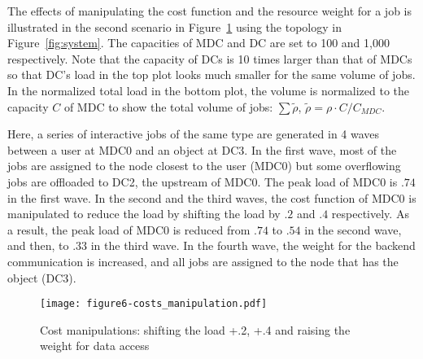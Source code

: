 The effects of manipulating the cost function and the resource weight
for a job is illustrated in the second scenario in
Figure~\ref{fig:lowering} using the topology in Figure~\ref{fig:system}.
The capacities of MDC and DC are set to 100 and 1,000 respectively.
Note that the capacity of DCs is 10 times larger than that of MDCs
so that DC's load in the top plot looks much smaller for the same
volume of jobs.
In the normalized total load in the bottom plot, the volume is normalized
to the capacity $C$ of MDC to show the total volume of jobs:
$\sum \tilde{\rho}$, \:$\tilde{\rho} = \rho \cdot C/C_{MDC}$.

Here, a series of interactive jobs of the same type are generated in
4 waves between a user at MDC0 and an object at DC3.
In the first wave,  most of the jobs are assigned to the node closest
to the user (MDC0) but some overflowing jobs are offloaded to DC2, the
upstream of MDC0.
The peak load of MDC0 is $.74$ in the first wave.
In the second and the third waves, the cost function of MDC0 is
manipulated to reduce the load by shifting the load by $.2$ and $.4$
respectively. As a result, the peak load of MDC0 is
reduced from $.74$ to $.54$ in the second wave, and then, to $.33$ in the
third wave.
In the fourth wave, the weight for the backend communication is
increased, and all jobs are assigned to the node that has the object
(DC3).

\begin{figure}[tb]
  \begin{center}
    \texttt{[image: figure6-costs\_manipulation.pdf]}
    \vspace{-4.0ex}
    \caption{Cost manipulations: shifting the load +.2,
      +.4 and raising the weight for data access}
    \smallskip
    \raggedright
    \small
    \label{fig:lowering}
  \end{center}
\end{figure}


